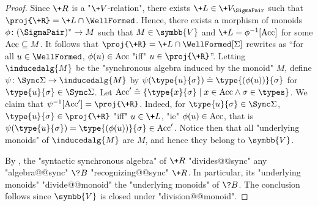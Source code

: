 \begin{proof}
	 Since $\+R$ is a "$\+V$-relation", there exists
	$\+L \in \+V_{\SigmaPair}$ such that $\proj{\+R} = \+L \cap \WellFormed$.
	Hence, there exists a morphism of monoids $\phi\colon (\SigmaPair)^* \to M$ such 
	that $M \in \symbb{V}$ and $\+L = \phi^{-1}[\Acc]$ for some $\textrm{Acc} \subseteq M$.
	It follows that $\proj{\+R} = \+L \cap \WellFormed[\Sigma]$ rewrites as
	``for all $u \in \WellFormed$, $\phi(u) \in \textrm{Acc}$ "iff" $u \in \proj{\+R}$''.
	Letting $\inducedalg{M}$ be the "synchronous algebra induced by the monoid" $M$, define
	$\psi\colon \Sync\Sigma \to \inducedalg{M}$ by $\psi(\type{u}{\sigma}) \defeq
	\type{(\phi(u))}{\sigma}$ for $\type{u}{\sigma} \in \Sync\Sigma$.
	Let $\Acc' \defeq \{\type{x}{\sigma} \mid x \in \Acc \land \sigma \in \types\}$.
	We claim that $\psi^{-1}[\Acc'] = \proj{\+R}$. Indeed, for $\type{u}{\sigma} \in \Sync\Sigma$,
	$\type{u}{\sigma} \in \proj{\+R}$ "iff" $u \in \+L$,
	"ie" $\phi(u) \in \textrm{Acc}$,
	that is $\psi(\type{u}{\sigma}) = \type{(\phi(u))}{\sigma} \in \Acc'$.
	Notice then that all "underlying monoids" of $\inducedalg{M}$ are $M$,
	and hence they belong to $\symbb{V}$.

	 By , 
	the "syntactic synchronous algebra" of $\+R$ "divides@@sync"
	any "algebra@@sync" $\?B$ "recognizing@@sync" $\+R$.
	In particular, its "underlying monoids" "divide@@monoid" the "underlying monoids" of $\?B$. The conclusion follows since $\symbb{V}$ is closed under "division@@monoid". 
	

\end{proof}
